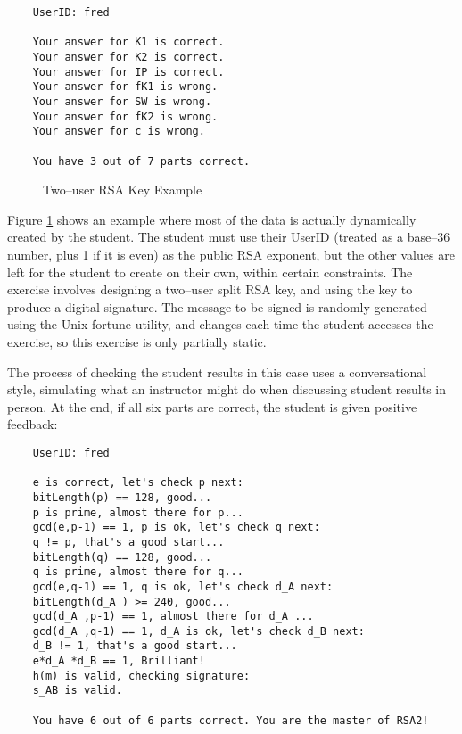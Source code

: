 \documentclass[12pt]{article}
\begin{document}
\begin{verbatim}
    UserID: fred

    Your answer for K1 is correct.
    Your answer for K2 is correct.
    Your answer for IP is correct.
    Your answer for fK1 is wrong.
    Your answer for SW is wrong.
    Your answer for fK2 is wrong.
    Your answer for c is wrong.

    You have 3 out of 7 parts correct.
\end{verbatim}

\begin{figure}[ht]
\begin{center}
\caption{Two--user RSA Key Example}
\label{fig:RSA2}
\end{center}
\end{figure}


\vspace{11pt}

Figure \ref{fig:RSA2} shows an example
where most of the data is actually dynamically created by the student.
The student must use their UserID (treated as a base--36
number, plus 1 if it is even) as the public RSA exponent, but the other
values are left for the student to create on their own, within certain constraints.
The exercise involves designing a two--user split RSA key, and using the key
to produce a digital signature.  The message to be signed is
randomly generated using the Unix fortune utility, and changes
each time the student accesses the exercise, so this exercise is only partially static.

\vspace{11pt}

The process of checking the student results in this case
uses a conversational style, simulating what an instructor might do when
discussing student results in person.  At the end, if all six parts are correct,
the student is given positive feedback:

\begin{verbatim}
    UserID: fred
    
    e is correct, let's check p next:
    bitLength(p) == 128, good...
    p is prime, almost there for p...
    gcd(e,p-1) == 1, p is ok, let's check q next:
    q != p, that's a good start...
    bitLength(q) == 128, good...
    q is prime, almost there for q...
    gcd(e,q-1) == 1, q is ok, let's check d_A next:
    bitLength(d_A ) >= 240, good...
    gcd(d_A ,p-1) == 1, almost there for d_A ...
    gcd(d_A ,q-1) == 1, d_A is ok, let's check d_B next:
    d_B != 1, that's a good start...
    e*d_A *d_B == 1, Brilliant!
    h(m) is valid, checking signature:
    s_AB is valid.

    You have 6 out of 6 parts correct. You are the master of RSA2!
\end{verbatim}
\end{document}
